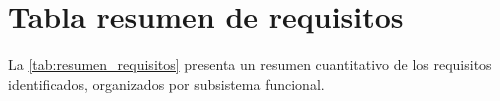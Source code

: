 


\section{Tabla resumen de requisitos}
\label{sec:resumen_requisitos}

La \cref{tab:resumen_requisitos} presenta un resumen cuantitativo de los requisitos
identificados, organizados por subsistema funcional.

